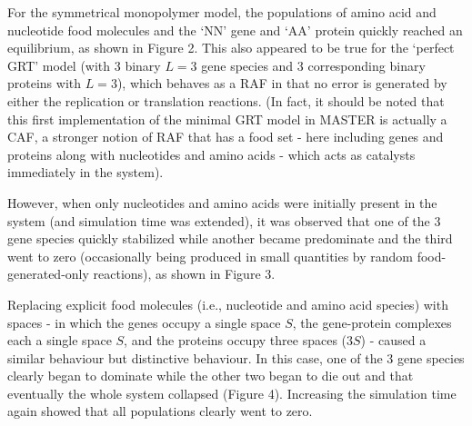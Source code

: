 \documentclass{article}
\begin{document}
\normalsize{For the symmetrical monopolymer model, the populations of amino acid and nucleotide food molecules and the `NN' gene and `AA' protein 
quickly reached an equilibrium, as shown in Figure 2.  This also appeared to be true for the `perfect GRT' model (with 3 binary $L=3$ gene species 
and 3 corresponding binary proteins with $L=3$), which behaves as a RAF in that no error is generated by either the replication or translation reactions. 
(In fact, it should be noted that this first implementation of the minimal GRT model in MASTER is actually a CAF, a stronger notion of RAF that has a food 
set - here including genes and proteins along with nucleotides and amino acids - which acts as catalysts immediately in the system). 

However, when only nucleotides and amino acids were initially present in the system (and simulation time was extended), it was observed that one of the 3 gene species quickly stabilized 
while another became predominate and the third went to zero (occasionally being produced in small quantities by random food-generated-only reactions), as shown in Figure 3.

Replacing explicit food molecules (i.e., nucleotide and amino acid species) with spaces - in which the genes occupy a single space $S$, the gene-protein complexes each 
a single space $S$, and the proteins occupy three spaces ($3S$) - caused a similar behaviour but distinctive behaviour.  In this case, one of the 3 gene species clearly began to dominate while 
the other two began to die out and that eventually the whole system collapsed (Figure 4).  Increasing the simulation time again showed that all populations 
clearly went to zero.


}
\end{document}

